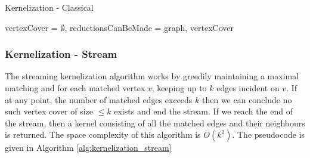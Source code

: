 \begin{algorithm}[htb]
    \caption{Kernelization - Classical}
    \label{alg:kernelization_classical}
    \DontPrintSemicolon



    vertexCover = $\emptyset$, reductionsCanBeMade = \KwTrue\;
    \Return graph, vertexCover\;
\end{algorithm}

\subsubsection{Kernelization - Stream}

The streaming kernelization algorithm works by greedily maintaining a maximal
matching and for each matched vertex \(v\), keeping up to \(k\) edges incident
on \(v\). If at any point, the number of matched edges exceeds \(k\) then we
can conclude no such vertex cover of size \(\leq k\) exists and end the stream.
If we reach the end of the stream, then a kernel consisting of all the matched
edges and their neighbours is returned. The space complexity of this algorithm
is \(O(k^2)\). The pseudocode is given in Algorithm
\ref{alg:kernelization_stream}

